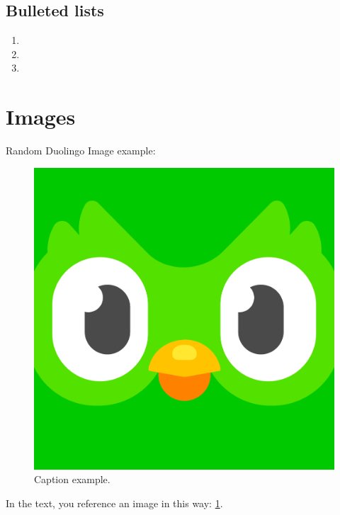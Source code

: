 \subsection{Bulleted lists}
\begin{enumerate}
    \item \lipsum[1]
    \item \lipsum[1]
    \item \lipsum[1]
\end{enumerate}

\section{Images}
Random Duolingo Image example:
\begin{figure}[H]
\centering
    \includegraphics[scale=0.1]{images/duolingo.png}
    \caption{Caption example.}
    \label{fig:duolingo}
\end{figure}

In the text, you reference an image in this way: \ref{fig:duolingo}.

